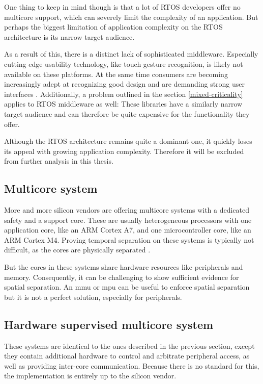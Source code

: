 One thing to keep in mind though is that a lot of RTOS developers offer no multicore support, which can severely limit the complexity of an application. But perhaps the biggest limitation of application complexity on the RTOS architecture is its narrow target audience.

As a result of this, there is a distinct lack of sophisticated middleware. Especially cutting edge usability technology, like touch gesture recognition, is likely not available on these platforms. At the same time consumers are becoming increasingly adept at recognizing good design and are demanding strong user interfaces \cite{HBR.September2015}.
Additionally, a problem outlined in the section \ref{mixed-criticality} applies to RTOS middleware as well: These libraries have a similarly narrow target audience and can therefore be quite expensive for the functionality they offer.

Although the RTOS architecture remains quite a dominant one, it quickly loses its appeal with growing application complexity. Therefore it will be excluded from further analysis in this thesis.
\subsection{Multicore system}
More and more silicon vendors are offering multicore systems with a dedicated safety and a support core. These are usually heterogeneous processors with one application core, like an ARM Cortex A7, and one microcontroller core, like an ARM Cortex M4. Proving temporal separation on these systems is typically not difficult, as the cores are physically separated \cite{Wittenstein.temporal.2017}.

But the cores in these systems share hardware resources like peripherals and memory. Consequently, it can be challenging to show sufficient evidence for spatial separation. An \acrshort{mmu} or \acrshort{mpu} can be useful to enforce spatial separation but it is not a perfect solution, especially for peripherals.
\subsection{Hardware supervised multicore system}
These systems are identical to the ones described in the previous section, except they contain additional hardware to control and arbitrate peripheral access, as well as providing inter-core communication.
Because there is no standard for this, the implementation is entirely up to the silicon vendor. 

